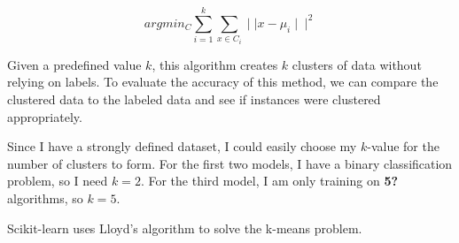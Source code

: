 \begin{equation}
argmin_C \sum_{i=1}^k \sum_{x\in C_i} \mid \mid  x-\mu_i \mid \mid ^2\label{kmeans}
\end{equation}

Given a predefined value $k$, this algorithm creates $k$ clusters of data without relying on labels.  To evaluate the accuracy of this method, we can compare the clustered data to the labeled data and see if instances were clustered appropriately.


Since I have a strongly defined dataset, I could easily choose my $k$-value for the number of clusters to form.  For the first two models, I have a binary classification problem, so I need $k=2$.  For the third model, I am only training on \textbf{5?} algorithms, so $k=5$.

Scikit-learn uses Lloyd's algorithm\cite{lloyd} to solve the k-means problem.


